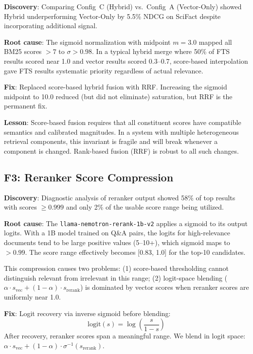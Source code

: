 \documentclass[11pt]{article}
\begin{document}
\textbf{Discovery}: Comparing Config~C (Hybrid) vs.\ Config~A (Vector-Only) showed
Hybrid underperforming Vector-Only by 5.5\% NDCG on SciFact despite incorporating
additional signal.

\textbf{Root cause}: The sigmoid normalization with midpoint $m=3.0$ mapped all BM25
scores $> 7$ to $\sigma > 0.98$. In a typical hybrid merge where 50\% of FTS results
scored near 1.0 and vector results scored 0.3--0.7, score-based interpolation gave
FTS results systematic priority regardless of actual relevance.

\textbf{Fix}: Replaced score-based hybrid fusion with RRF. Increasing the sigmoid
midpoint to 10.0 reduced (but did not eliminate) saturation, but RRF is the permanent
fix.

\textbf{Lesson}: Score-based fusion requires that all constituent scores have compatible
semantics and calibrated magnitudes. In a system with multiple heterogeneous retrieval
components, this invariant is fragile and will break whenever a component is changed.
Rank-based fusion (RRF) is robust to all such changes.

\subsection{F3: Reranker Score Compression}
\label{sec:failures:F3}

\textbf{Discovery}: Diagnostic analysis of reranker output showed 58\% of top results
with scores $\geq 0.999$ and only 2\% of the usable score range being utilized.

\textbf{Root cause}: The \texttt{llama-nemotron-rerank-1b-v2} applies a sigmoid to its
output logits. With a 1B model trained on Q\&A pairs, the logits for high-relevance
documents tend to be large positive values (5--10+), which sigmoid maps to $>0.99$.
The score range effectively becomes [0.83, 1.0] for the top-10 candidates.

This compression causes two problems: (1) score-based thresholding cannot distinguish
relevant from irrelevant in this range; (2) logit-space blending ($\alpha \cdot
s_{\text{vec}} + (1-\alpha) \cdot s_{\text{rerank}}$) is dominated by vector scores
when reranker scores are uniformly near 1.0.

\textbf{Fix}: Logit recovery via inverse sigmoid before blending:
\begin{equation}
  \text{logit}(s) = \log\!\left(\frac{s}{1-s}\right)
\end{equation}
After recovery, reranker scores span a meaningful range. We blend in logit space:
$\alpha \cdot s_{\text{vec}} + (1-\alpha) \cdot \sigma^{-1}(s_{\text{rerank}})$.
\end{document}
